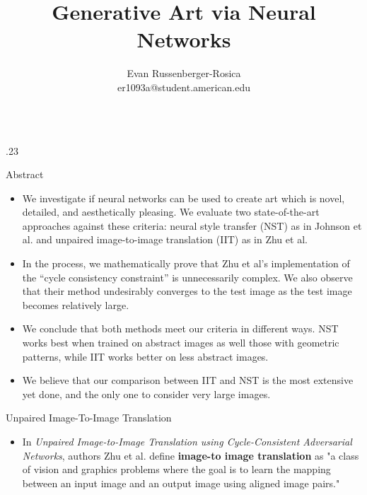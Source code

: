 \documentclass[8pt,final,hyperref={pdfpagelabels=false}]{beamer}
\title{\huge Generative Art via Neural Networks} %
\author{Evan Russenberger-Rosica  \texorpdfstring{\\}{} er1093a@student.american.edu} %
\institute{Department of Mathematics and Statistics - American University \\ 
\color {white} Learn more at evanrosica.com/GANArt/
} %
\theoremstyle{plain}
\begin{document}

\begin{frame} %

\begin{columns}[t] %

\begin{column}{.23\textwidth} %
                
    \begin{block}{Abstract}
        \begin{itemize}
            \item
            We investigate if neural networks can be used to create art which is novel, detailed, and aesthetically pleasing. We evaluate two state-of-the-art approaches against these criteria: neural style transfer (NST) as in Johnson et al. and unpaired image-to-image translation (IIT) as in Zhu et al. 
            
            \item In the process, we mathematically prove that Zhu et al's implementation of the “cycle consistency constraint” is unnecessarily complex. We also observe that their method undesirably converges to the test image as the test image becomes relatively large.
            
            
            \item We conclude that both methods meet our criteria in different ways. NST works best when trained on abstract images as well those with geometric patterns, while IIT works better on less abstract images.
            
            \item We believe that our comparison between IIT and NST is the most extensive yet done, and the only one to consider very large images. 
        \end{itemize}
    \end{block}
    
    \begin{block}{Unpaired Image-To-Image Translation}
        \begin{itemize}
            \item In \textit{Unpaired Image-to-Image Translation using Cycle-Consistent Adversarial Networks}, authors Zhu et al. define \textbf{image-to image translation} as "a class of vision and graphics problems where the goal is to learn the mapping between an input image and an output image using aligned image pairs." 
            

\end{itemize}
\end{block}
\end{column}
\end{columns}
\end{frame}
\end{document}

